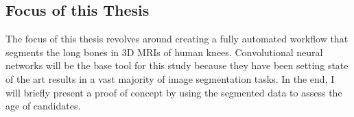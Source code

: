 \subsection{Focus of this Thesis}

The focus of this thesis revolves around creating a fully automated workflow that segments the long bones in 3D MRIs of human knees. Convolutional neural networks will be the base tool for this study because they have been setting state of the art results in a vast majority of image segmentation tasks. In the end, I will briefly present a proof of concept by using the segmented data to assess the age of candidates.

\newpage
